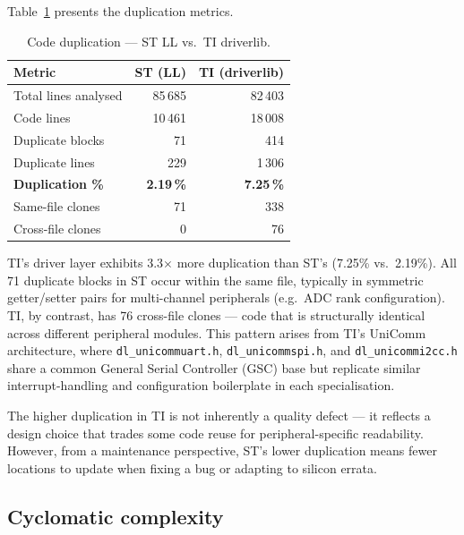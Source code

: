 Table~\ref{tab:ti-dup} presents the duplication metrics.

\begin{table}[H]
\centering
\caption{Code duplication --- ST LL vs.\ TI driverlib.}
\label{tab:ti-dup}
\begin{tabular}{l r r}
\toprule
\textbf{Metric} & \textbf{ST (LL)} & \textbf{TI (driverlib)} \\
\midrule
Total lines analysed     &    85\,685 &    82\,403 \\
Code lines               &    10\,461 &    18\,008 \\
Duplicate blocks         &        71 &       414 \\
Duplicate lines          &       229 &     1\,306 \\
\textbf{Duplication \%}  & \textbf{2.19\,\%} & \textbf{7.25\,\%} \\
\midrule
Same-file clones         &        71 &       338 \\
Cross-file clones        &         0 &        76 \\
\bottomrule
\end{tabular}
\end{table}

TI's driver layer exhibits 3.3$\times$ more duplication than ST's (7.25\% vs.\ 2.19\%).
All 71 duplicate blocks in ST occur within the same file, typically in symmetric
getter/setter pairs for multi-channel peripherals (e.g.\ ADC rank configuration).
TI, by contrast, has 76 cross-file clones --- code that is structurally identical across
different peripheral modules. This pattern arises from TI's UniComm architecture, where
\texttt{dl\_unicommuart.h}, \texttt{dl\_unicommspi.h}, and \texttt{dl\_unicommi2cc.h}
share a common General Serial Controller (GSC) base but replicate similar interrupt-handling
and configuration boilerplate in each specialisation.

The higher duplication in TI is not inherently a quality defect --- it reflects a design
choice that trades some code reuse for peripheral-specific readability. However, from a
maintenance perspective, ST's lower duplication means fewer locations to update when fixing
a bug or adapting to silicon errata.

\subsection{Cyclomatic complexity}
\label{subsec:ti-complexity}

